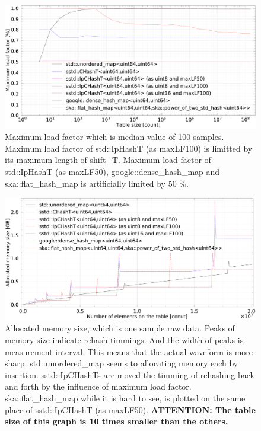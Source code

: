 \newpage
\begin{figure}[]
  \includegraphics[scale=0.24]{./fig_bench/maxLoadFactor_med.pdf}
  \caption{
    Maximum load factor which is median value of 100 samples.
    Maximum load factor of std::IpHashT (as maxLF100) is limitted by its maximum length of shift\_T.
    Maximum load factor of std::IpHashT (as maxLF50), google::dense\_hash\_map and ska::flat\_hash\_map is artificially limited by 50 \%.
  }
  \label{fig_bench_LF}
\end{figure}


\begin{figure}[]
  \hspace{-1mm}
  \includegraphics[scale=0.24]{./fig_bench/usedMemory.pdf}
  \caption{
    Allocated memory size, which is one sample raw data.
    Peaks of memory size indicate rehash timmings.
    And the width of peaks is measurement interval.
    This means that the actual waveform is more sharp.
    std::unordered\_map seems to allocating memory each by insertion.
    sstd::IpCHashTs are moved the timming of rehashing back and forth by the influence of maximum load factor.
    ska::flat\_hash\_map while it is hard to see, is plotted on the same place of sstd::IpCHashT (as maxLF50).
    {\bf ATTENTION: The table size of this graph is 10 times smaller than the others.}
  }
  \label{fig_bench_memory}
\end{figure}

